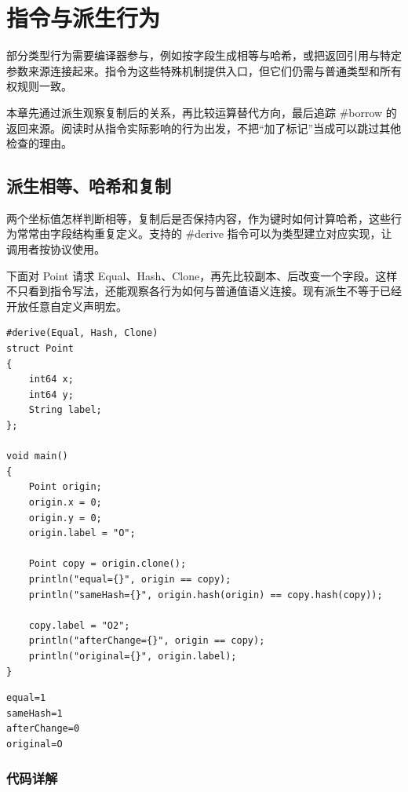 \chapter{指令与派生行为}
\label{ch:22}

部分类型行为需要编译器参与，例如按字段生成相等与哈希，或把返回引用与特定参数来源连接起来。指令为这些特殊机制提供入口，但它们仍需与普通类型和所有权规则一致。

本章先通过派生观察复制后的关系，再比较运算替代方向，最后追踪 \#borrow 的返回来源。阅读时从指令实际影响的行为出发，不把“加了标记”当成可以跳过其他检查的理由。

\section{派生相等、哈希和复制}

两个坐标值怎样判断相等，复制后是否保持内容，作为键时如何计算哈希，这些行为常常由字段结构重复定义。支持的 \#derive 指令可以为类型建立对应实现，让调用者按协议使用。

下面对 Point 请求 Equal、Hash、Clone，再先比较副本、后改变一个字段。这样不只看到指令写法，还能观察各行为如何与普通值语义连接。现有派生不等于已经开放任意自定义声明宏。

\par
\medskip
\begin{lstlisting}[style=chali]
#derive(Equal, Hash, Clone)
struct Point
{
    int64 x;
    int64 y;
    String label;
};

void main()
{
    Point origin;
    origin.x = 0;
    origin.y = 0;
    origin.label = "O";

    Point copy = origin.clone();
    println("equal={}", origin == copy);
    println("sameHash={}", origin.hash(origin) == copy.hash(copy));

    copy.label = "O2";
    println("afterChange={}", origin == copy);
    println("original={}", origin.label);
}
\end{lstlisting}
\par
\medskip

\par
\medskip
\begin{lstlisting}[style=out]
equal=1
sameHash=1
afterChange=0
original=O
\end{lstlisting}
\par
\medskip

\subsection*{代码详解}

